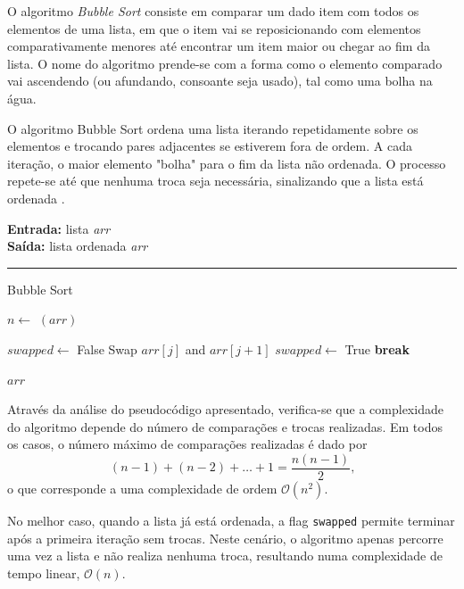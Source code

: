 \documentclass[conference]{IEEEtran}
\begin{document}
O algoritmo \textit{Bubble Sort} consiste em comparar um dado item com todos os elementos de uma lista, em que o item vai se reposicionando com elementos comparativamente menores até encontrar um item maior ou chegar ao fim da lista. O nome do algoritmo prende-se com a forma como o elemento comparado vai ascendendo (ou afundando, consoante seja usado), tal como uma bolha na água. 

O algoritmo Bubble Sort ordena uma lista iterando repetidamente sobre os elementos e trocando pares adjacentes se estiverem fora de ordem. A cada iteração, o maior elemento "bolha" para o fim da lista não ordenada. O processo repete-se até que nenhuma troca seja necessária, sinalizando que a lista está ordenada \cite{asthana2016bubble}.

\begin{algorithm}[H]
    \raggedright
    \vspace{.1em}
    \textbf{Entrada:} lista \textit{arr} \\
    \textbf{Saída:} lista ordenada \textit{arr} \\
    \vspace{.5em}
    \hrule 
    \caption{Bubble Sort}
    \begin{algorithmic}[1]
        \State $n \gets$ $(arr)$
        
            \State $swapped \gets$ False
                    \State Swap $arr[j]$ and $arr[j+1]$
                    \State $swapped \gets$ True
                \EndIf
            \EndFor
                \State \textbf{break}
            \EndIf
        \EndFor
    
        \State \Return $arr$
    \end{algorithmic}
\end{algorithm}

Através da análise do pseudocódigo apresentado, verifica-se que a complexidade do algoritmo depende do número de comparações e trocas realizadas. Em todos os casos, o número máximo de comparações realizadas é dado por
\[
(n - 1) + (n - 2) + \ldots + 1 = \frac{n(n - 1)}{2} \text{,}
\]
o que corresponde a uma complexidade de ordem \(\mathcal{O}(n^2)\).

No melhor caso, quando a lista já está ordenada, a flag \texttt{swapped} permite terminar após a primeira iteração sem trocas. Neste cenário, o algoritmo apenas percorre uma vez a lista e não realiza nenhuma troca, resultando numa complexidade de tempo linear, $\mathcal{O}(n)$.
\end{document}
